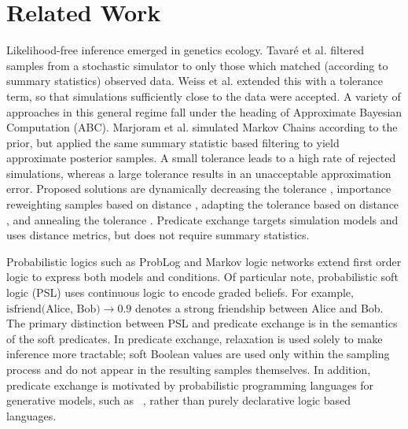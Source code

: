 \section{Related Work}

Likelihood-free inference emerged in genetics ecology.
Tavar{\'e} et al.  
filtered samples from a stochastic simulator to only those which matched (according to summary statistics) observed data. 
Weiss et al.  extended this with a tolerance term, so that simulations sufficiently close to the data were accepted.
A variety of approaches in this general regime  \cite{beaumont2002approximate,sisson2007sequential} fall under the heading of Approximate Bayesian Computation (ABC).
Marjoram et al.  simulated Markov Chains according to the prior, but applied the same summary statistic based filtering to yield approximate posterior samples.
A small tolerance leads to a high rate of rejected simulations, whereas a large tolerance results in an unacceptable approximation error.
Proposed solutions are dynamically decreasing the tolerance \cite{toni2008approximate}, importance reweighting samples based on distance \cite{wegmann2009efficient}, adapting the tolerance based on distance \cite{del2012adaptive,lenormand2013adaptive}, and annealing the tolerance \cite{albert2015simulated}.
Predicate exchange targets simulation models and uses distance metrics, but does not require summary statistics.


Probabilistic logics such as ProbLog \cite{richardson2006markov} and Markov logic networks \cite{de2007problog} extend first order logic to express both models and conditions.
Of particular note, probabilistic soft logic (PSL) \cite{brocheler2012probabilistic,kimmig2012short} uses continuous logic to encode graded beliefs.
For example, $\text{isfriend(Alice, Bob)} \to 0.9$ denotes a strong friendship between Alice and Bob.
The primary distinction between PSL and predicate exchange is in the semantics of the soft predicates.
In predicate exchange, relaxation is used solely to make inference more tractable; soft Boolean values are used only within the sampling process and do not appear in the resulting samples themselves.
In addition, predicate exchange is motivated by probabilistic programming languages for generative models, such as ~\citep{milch20071, wood2014new,mansinghka2014venture,goodman2008church}, rather than purely declarative logic based languages.


